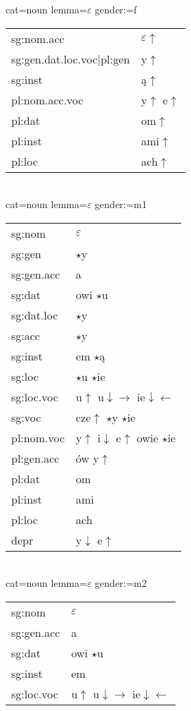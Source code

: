 \documentclass{article}
\begin{document}
\begin{multicols}{2}
cat=noun lemma=$\varepsilon$ gender:=f\\
\begin{tabular}{l|l}
sg:nom.acc & $\varepsilon\uparrow$\\
sg:gen.dat.loc.voc|pl:gen & y$\uparrow$\\
sg:inst & ą$\uparrow$\\
pl:nom.acc.voc & y$\uparrow$ e$\uparrow$\\
pl:dat & om$\uparrow$\\
pl:inst & ami$\uparrow$\\
pl:loc & ach$\uparrow$\\
\end{tabular}\\
cat=noun lemma=$\varepsilon$ gender:=m1\\
\begin{tabular}{l|l}
sg:nom & $\varepsilon$\\
sg:gen & $\star$y\\
sg:gen.acc & a\\
sg:dat & owi $\star$u\\
sg:dat.loc & $\star$y\\
sg:acc & $\star$y\\
sg:inst & em $\star$ą\\
sg:loc & $\star$u $\star$ie\\
sg:loc.voc & u$\uparrow$ u$\downarrow\rightarrow$ ie$\downarrow\leftarrow$\\
sg:voc & cze$\uparrow$ $\star$y $\star$ie\\
pl:nom.voc & y$\uparrow$ i$\downarrow$ e$\uparrow$ owie $\star$ie\\
pl:gen.acc & ów y$\uparrow$\\
pl:dat & om\\
pl:inst & ami\\
pl:loc & ach\\
depr & y$\downarrow$ e$\uparrow$\\
\end{tabular}\\
cat=noun lemma=$\varepsilon$ gender:=m2\\
\begin{tabular}{l|l}
sg:nom & $\varepsilon$\\
sg:gen.acc & a\\
sg:dat & owi $\star$u\\
sg:inst & em\\
sg:loc.voc & u$\uparrow$ u$\downarrow\rightarrow$ ie$\downarrow\leftarrow$\\

\end{tabular}
\end{multicols}
\end{document}
